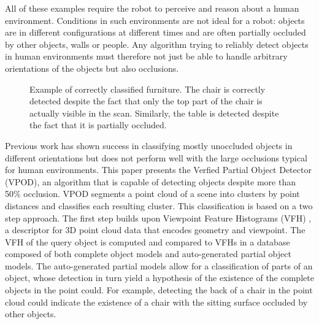 \documentclass[letterpaper, 10pt, conference]{ieeeconf}
\begin{document}
All of these examples require the robot to perceive and reason about a human
environment. Conditions in such environments are not ideal for a robot:
objects are in different configurations at different times and are often partially occluded by other objects, walls or people. Any algorithm trying to reliably detect objects in human environments must therefore not
just be able to handle arbitrary orientations of the objects but also
occlusions.

\begin{figure}[t]
   \centering
   \hfil
   \caption{Example of correctly classified furniture. The chair is correctly detected despite the fact that only the top part of the chair is actually visible in the scan. Similarly, the table is detected despite the fact that it is partially occluded.}
   \vspace{-15pt}
   \label{examples}
\end{figure}

Previous work has shown success in classifying mostly unoccluded objects in
different orientations but does not perform well with the
large occlusions typical for human environments. This paper presents the
Verfied Partial Object Detector (VPOD), an algorithm that is capable of
detecting objects despite more than 50\% occlusion. VPOD segments a point
cloud of a scene into clusters by point distances and classifies each resulting cluster. This classification is based on a two step approach. The first step builds upon Viewpoint Feature Histograms (VFH) \cite{Rusu2010}, a descriptor for 3D point cloud data that encodes geometry and viewpoint. The VFH of the query object is computed and compared to VFHs in a database
composed of both complete object models and auto-generated partial object
models. The auto-generated partial models allow for a classification of
parts of an object, whose detection in turn yield a hypothesis of the existence
of the complete objects in the point could. For example, detecting the back of a chair in the
point cloud could indicate the existence of a chair with the
sitting surface occluded by other objects.
\end{document}
